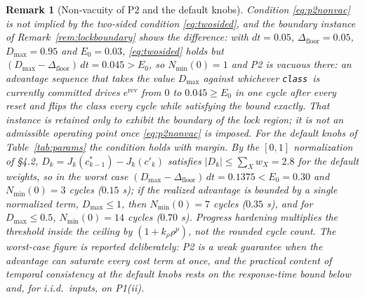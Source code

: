 \documentclass[11pt]{article}
\newtheorem{remark}{Remark}
\newcommand{\Class}{\texttt{class}}
\newcommand{\Dfloor}{\Delta_{\text{floor}}}
\newcommand{\Erev}{e^{\text{rev}}}
\begin{document}
\begin{remark}[Non-vacuity of P2 and the default knobs] \label{rem:p2nonvac}
Condition \eqref{eq:p2nonvac} is not implied by the two-sided condition \eqref{eq:twosided}, and the boundary instance of Remark~\ref{rem:lockboundary} shows the difference: with $dt = 0.05$, $\Dfloor = 0.05$, $D_{\max} = 0.95$ and $E_0 = 0.03$, \eqref{eq:twosided} holds but $(D_{\max}-\Dfloor)\,dt = 0.045 > E_0$, so $N_{\min}(0) = 1$ and P2 is vacuous there: an advantage sequence that takes the value $D_{\max}$ against whichever \Class\ is currently committed drives $\Erev$ from $0$ to $0.045 \ge E_0$ in one cycle after every reset and flips the class every cycle while satisfying the bound exactly. That instance is retained only to exhibit the boundary of the lock region; it is not an admissible operating point once \eqref{eq:p2nonvac} is imposed. For the default knobs of Table~\ref{tab:params} the condition holds with margin. By the $[0,1]$ normalization of \S4.2, $D_k = J_k(c^*_{k-1}) - J_k(c'_k)$ satisfies $|D_k| \le \sum_X w_X = 2.8$ for the default weights, so in the worst case $(D_{\max}-\Dfloor)\,dt = 0.1375 < E_0 = 0.30$ and $N_{\min}(0) = 3$ cycles ($0.15$ s); if the realized advantage is bounded by a single normalized term, $D_{\max} \le 1$, then $N_{\min}(0) = 7$ cycles ($0.35$ s), and for $D_{\max} \le 0.5$, $N_{\min}(0) = 14$ cycles ($0.70$ s). Progress hardening multiplies the threshold inside the ceiling by $(1 + k_\rho \rho^p)$, not the rounded cycle count. The worst-case figure is reported deliberately: P2 is a weak guarantee when the advantage can saturate every cost term at once, and the practical content of temporal consistency at the default knobs rests on the response-time bound below and, for i.i.d.\ inputs, on P1(ii).
\end{remark}
\end{document}
